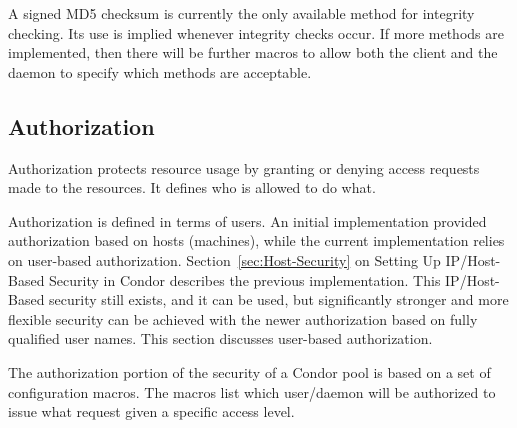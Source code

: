 A signed MD5 checksum is currently the only available method
for integrity checking.
Its use is implied whenever integrity checks occur.
If more methods are implemented, then there will be further
macros to allow both the client and the daemon to specify
which methods are acceptable.

\subsection{\label{sec:Security-Authorization}Authorization}

Authorization protects resource usage by granting or denying
access requests made to the resources.
It defines who is allowed to do what.

Authorization is defined in terms of users.
An initial implementation provided authorization
based on hosts (machines), while the current implementation
relies on user-based authorization.
Section~\ref{sec:Host-Security}
on Setting Up IP/Host-Based Security in Condor describes the
previous implementation.
This IP/Host-Based security still exists, and it can be used,
but significantly stronger and more flexible
security can be achieved with the newer
authorization based on fully qualified user names.
This section discusses user-based authorization. 


The authorization portion of the security of a Condor pool is
based on a set of configuration macros.
The macros list which user/daemon will be authorized
to issue what request given a specific access level.

